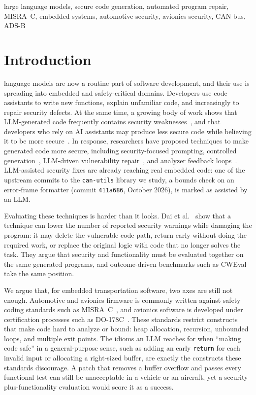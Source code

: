 \documentclass[12pt]{IEEEtran}
\begin{document}
\begin{IEEEkeywords}
large language models, secure code generation, automated program repair, MISRA~C, embedded systems, automotive security, avionics security, CAN bus, ADS-B
\end{IEEEkeywords}

\section{Introduction}
 language models are now a routine part of software development, and their use is spreading into embedded and safety-critical domains. Developers use code assistants to write new functions, explain unfamiliar code, and increasingly to repair security defects. At the same time, a growing body of work shows that LLM-generated code frequently contains security weaknesses~\cite{pearce2022asleep, khoury2023chatgpt, tihanyi2023formai}, and that developers who rely on AI assistants may produce less secure code while believing it to be more secure~\cite{perry2023users}. In response, researchers have proposed techniques to make generated code more secure, including security-focused prompting, controlled generation~\cite{he2023sven}, LLM-driven vulnerability repair~\cite{pearce2023zeroshot}, and analyzer feedback loops~\cite{yan2025guiding}. LLM-assisted security fixes are already reaching real embedded code: one of the upstream commits to the \texttt{can-utils} library we study, a bounds check on an error-frame formatter (commit \texttt{411a686}, October 2026), is marked as assisted by an LLM.

Evaluating these techniques is harder than it looks. Dai et al.~\cite{rethinking2026} show that a technique can lower the number of reported security warnings while damaging the program: it may delete the vulnerable code path, return early without doing the required work, or replace the original logic with code that no longer solves the task. They argue that security and functionality must be evaluated together on the same generated programs, and outcome-driven benchmarks such as CWEval~\cite{peng2025cweval} take the same position.

We argue that, for embedded transportation software, two axes are still not enough. Automotive and avionics firmware is commonly written against safety coding standards such as MISRA~C~\cite{misra2012}, and avionics software is developed under certification processes such as DO-178C~\cite{do178c}. These standards restrict constructs that make code hard to analyze or bound: heap allocation, recursion, unbounded loops, and multiple exit points. The idioms an LLM reaches for when ``making code safe'' in a general-purpose sense, such as adding an early \texttt{return} for each invalid input or allocating a right-sized buffer, are exactly the constructs these standards discourage. A patch that removes a buffer overflow and passes every functional test can still be unacceptable in a vehicle or an aircraft, yet a security-plus-functionality evaluation would score it as a success.
\end{document}
